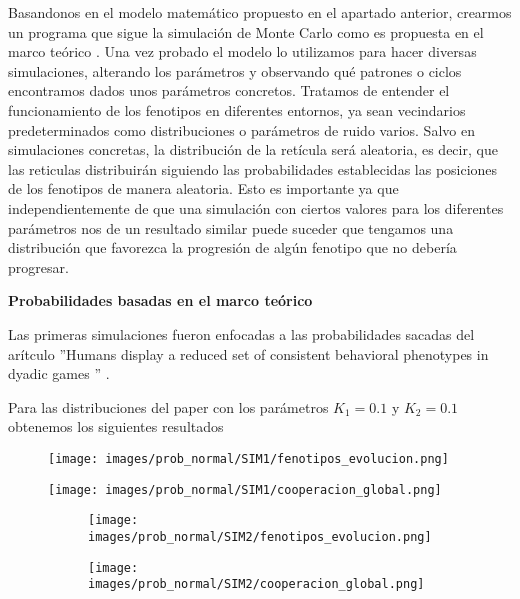 \documentclass[a4paper,12pt]{report}
\begin{document}
Basandonos en el modelo matemático propuesto en el apartado anterior, crearmos un programa que sigue la simulación de Monte Carlo como es propuesta en el marco teórico \cite{TFG_SimulacionAgentesFenotipos}.
Una vez probado el modelo lo utilizamos para hacer diversas simulaciones, alterando los parámetros y observando qué patrones o ciclos encontramos dados unos parámetros concretos.
Tratamos de entender el funcionamiento de los fenotipos en diferentes entornos, ya sean vecindarios predeterminados como distribuciones o parámetros de ruido varios.
Salvo en simulaciones concretas, la distribución de la retícula será aleatoria, es decir, que las reticulas distribuirán siguiendo las probabilidades establecidas las posiciones de los fenotipos de manera aleatoria. Esto es importante ya que independientemente de que una simulación con ciertos valores para los diferentes parámetros nos de un resultado similar puede suceder que tengamos una distribución que favorezca la progresión de algún fenotipo que no debería progresar.

\vspace{1.5em}
\noindent\textbf{Probabilidades basadas en el marco teórico}
\vspace{0.5em}


Las primeras simulaciones fueron enfocadas a las probabilidades sacadas del arítculo ”Humans
display a reduced set of consistent behavioral phenotypes in dyadic games
” \cite{paper_principal}.

Para las distribuciones del paper con los parámetros \( K_1 = 0.1\) y \( K_2 = 0.1\) obtenemos los siguientes resultados

\begin{figure}[h]
    \centering
    \begin{minipage}{0.49\textwidth}
    \centering
    \texttt{[image: images/prob\_normal/SIM1/fenotipos\_evolucion.png]}
    \label{fig:enter-label}
    \end{minipage}
    \hfill
    \begin{minipage}{0.49\textwidth}
    \centering
    \texttt{[image: images/prob\_normal/SIM1/cooperacion\_global.png]}
    \label{fig:enter-label}
    \end{minipage}
\end{figure}
\begin{figure}[h]
    \centering
    \begin{subfigure}[t]{0.49\textwidth}
        \centering
        \texttt{[image: images/prob\_normal/SIM2/fenotipos\_evolucion.png]}
        \label{fig:enter-label}
    \end{subfigure}
    \hfill
    \begin{subfigure}[t]{0.49\textwidth}
        \centering
        \texttt{[image: images/prob\_normal/SIM2/cooperacion\_global.png]}
        \label{fig:enter-label}
    \end{subfigure}
\end{figure}
\end{document}
